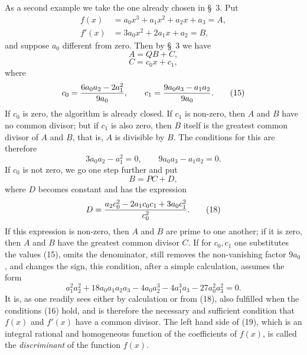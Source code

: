 \documentclass[11pt]{article}
\begin{document}
As a second example we take the one already chosen in \S~3. Put
\begin{equation}
\begin{aligned}
 f(x)&=a_0x^3+a_1x^2+a_2x+a_3=A,\\
 f'(x)&=3a_0x^2+2a_1x+a_2=B,
\end{aligned}
\tag{12}
\end{equation}
and suppose $a_0$ different from zero. Then by \S~3 we have
\begin{equation}
 A=QB+C,
\tag{13}
\end{equation}
\begin{equation}
 C=c_0x+c_1,
\tag{14}
\end{equation}
where
\begin{equation}
 c_0={6a_0a_2-2a_1^2\over 9a_0},
 \qquad
 c_1={9a_0a_3-a_1a_2\over 9a_0}.
\tag{15}
\end{equation}
If $c_0$ is zero, the algorithm is already closed. If $c_1$ is non-zero, then $A$ and $B$ have no common divisor; but if $c_1$ is also zero, then $B$ itself is the greatest common divisor of $A$ and $B$, that is, $A$ is divisible by $B$. The conditions for this are therefore
\begin{equation}
 3a_0a_2-a_1^2=0,
 \qquad
 9a_0a_3-a_1a_2=0.
\tag{16}
\end{equation}
If $c_0$ is not zero, we go one step further and put
\begin{equation}
 B=PC+D,
\tag{17}
\end{equation}
where $D$ becomes constant and has the expression
\begin{equation}
 D={a_2c_0^2-2a_1c_0c_1+3a_0c_1^2\over c_0^2}.
\tag{18}
\end{equation}
If this expression is non-zero, then $A$ and $B$ are prime to one another; if it is zero, then $A$ and $B$ have the greatest common divisor $C$. If for $c_0,c_1$ one substitutes the values (15), omits the denominator, still removes the non-vanishing factor $9a_0$, and changes the sign, this condition, after a simple calculation, assumes the form
\begin{equation}
 a_1^2a_2^2+18a_0a_1a_2a_3-4a_0a_2^3-4a_1^3a_3-27a_0^2a_3^2=0.
\tag{19}
\end{equation}
It is, as one readily sees either by calculation or from (18), also fulfilled when the conditions (16) hold, and is therefore the necessary and sufficient condition that $f(x)$ and $f'(x)$ have a common divisor. The left hand side of (19), which is an integral rational and homogeneous function of the coefficients of $f(x)$, is called the \emph{discriminant} of the function $f(x)$.
\end{document}
